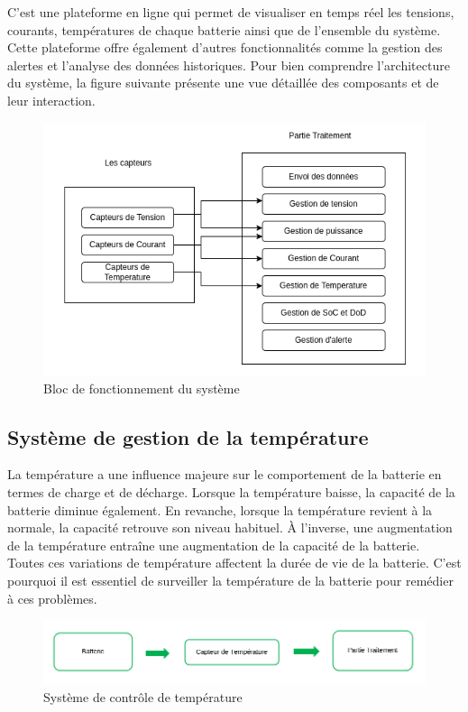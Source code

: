 C'est une plateforme en ligne qui permet de visualiser en temps réel les tensions, courants, températures de chaque batterie ainsi que de l'ensemble du système. Cette plateforme offre également d'autres fonctionnalités comme la gestion des alertes et l'analyse des données historiques.
Pour bien comprendre l'architecture du système, la figure suivante présente une vue détaillée des composants et de leur interaction.

\begin{figure}[H]
	\centering
	\includegraphics[width=15cm]{./img/schemaFonctionnel.png}
	\caption{Bloc de fonctionnement du système }
	\label{i1}
	
\end{figure}

\subsection*{Système de gestion de la température}
La température a une influence majeure sur le comportement de la batterie en termes de charge et de décharge. Lorsque la température baisse, la capacité de la batterie diminue également. En revanche, lorsque la température revient à la normale, la capacité retrouve son niveau habituel. À l'inverse, une augmentation de la température entraîne une augmentation de la capacité de la batterie.\\

\noindent Toutes ces variations de température affectent la durée de vie de la batterie. C'est pourquoi il est essentiel de surveiller la température de la batterie pour remédier à ces problèmes.
\\

\begin{figure}[H]
	\centering
	\includegraphics[width=17cm]{./img/capteurTemperature.png}
	\caption{Système de contrôle de température }
	\label{i1}
\end{figure}

